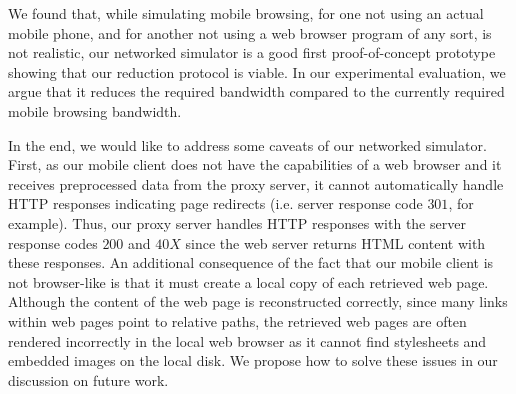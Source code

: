 We found that, while simulating mobile browsing, for one not using an actual mobile phone, and for another not using a web browser program of any sort, is not realistic, our networked simulator is a good first proof-of-concept prototype showing that our reduction protocol is viable. In our experimental evaluation, we argue that it reduces the required bandwidth compared to the currently required mobile browsing bandwidth.

In the end, we would like to address some caveats of our networked simulator. First, as our mobile client does not have the capabilities of a web browser and it receives preprocessed data from the proxy server, it cannot automatically handle HTTP responses indicating page redirects (i.e. server response code $301$, for example). Thus, our proxy server handles HTTP responses with the server response codes $200$ and $40X$ since the web server returns HTML content with these responses. An additional consequence of the fact that our mobile client is not browser-like is that it must create a local copy of each retrieved web page. Although the content of the web page is reconstructed correctly, since many links within web pages point to relative paths, the retrieved web pages are often rendered incorrectly in the local web browser as it cannot find stylesheets and embedded images on the local disk. We propose how to solve these issues in our discussion on future work.
